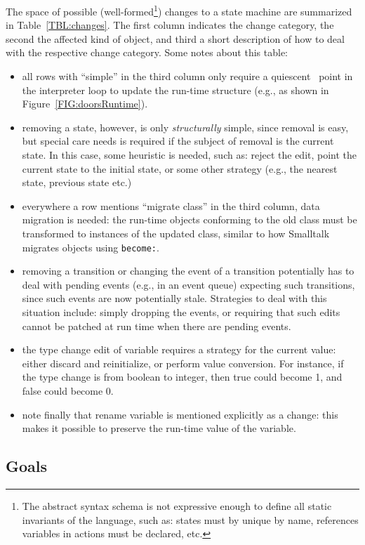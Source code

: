 \documentclass[english,submission]{programming}
\begin{document}
The space of possible (well-formed\footnote{The abstract syntax schema is not expressive enough to define all static invariants of the language, such as: states must by unique by name, references variables in actions must be declared, etc.}) changes to a state machine are summarized in Table~\ref{TBL:changes}.
The first column indicates the change category, the second the affected kind of object, and third a short description of how to deal with the respective change category. Some notes about this table:
\begin{itemize}
\item all rows with ``simple'' in the third column only require a quiescent~\cite{Tranquility} point in the interpreter loop to update the run-time structure (e.g., as shown in Figure~\ref{FIG:doorsRuntime}).
\item removing a state, however, is only \textit{structurally} simple, since removal is easy, but special care needs is required if the subject of removal is the current state. In this case, some heuristic is needed, such as: reject the edit, point the current state to the initial state, or some other strategy (e.g., the nearest state, previous state etc.)
\item everywhere a row mentions ``migrate class'' in the third column, data migration is needed: the run-time objects conforming to the old class must be transformed to instances of the updated class, similar to how Smalltalk migrates objects using \lstinline{become:}.
\item removing a transition or changing the event of a transition potentially has to deal with pending events (e.g., in an event queue) expecting such transitions, since such events are now potentially stale. Strategies to deal with this situation include: simply dropping the events, or requiring that such edits cannot be patched at run time when there are pending events.
\item the type change edit of variable requires a strategy for the current value: either discard and reinitialize, or perform value conversion. For instance, if the type change is from boolean to integer, then true could become 1, and false could become 0.
\item note finally that rename variable is mentioned explicitly as a change: this makes it possible to preserve the run-time value of the variable.
\end{itemize}

\subsection{Goals}
\end{document}
